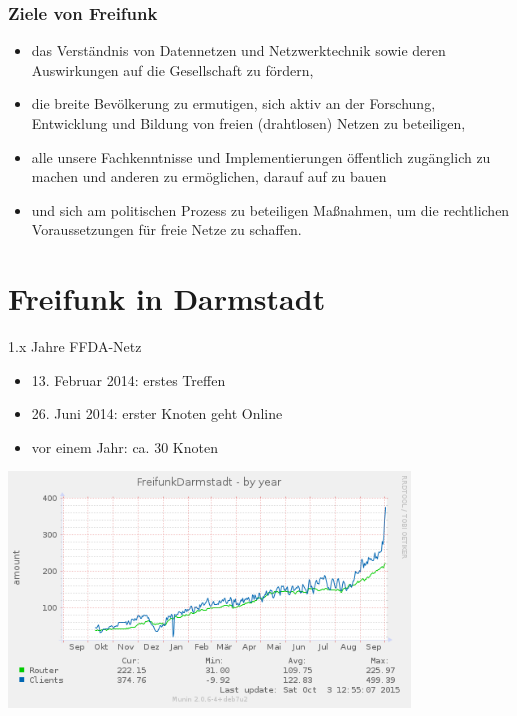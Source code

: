 \documentclass[handout]{beamer}
\begin{document}
\begin{frame}
	\frametitle{Ziele von Freifunk}
	\begin{itemize}[<+->]
		\item das Verständnis von Datennetzen und Netzwerktechnik sowie deren Auswirkungen auf die Gesellschaft zu fördern,
		\item die breite Bevölkerung zu ermutigen, sich aktiv an der Forschung, Entwicklung und Bildung von freien (drahtlosen) Netzen zu beteiligen,
		\item 	alle unsere Fachkenntnisse und Implementierungen öffentlich zugänglich zu machen und anderen zu ermöglichen, darauf auf zu bauen
		\item und sich am politischen Prozess zu beteiligen Maßnahmen, um die rechtlichen Voraussetzungen für freie Netze zu schaffen.
	\end{itemize}
\end{frame}


\section{Freifunk in Darmstadt}




\begin{frame}{1.x Jahre FFDA-Netz}
	\vfill
	\begin{itemize}[<+->]
		\item 13. Februar 2014: erstes Treffen
		\item 26. Juni 2014: erster Knoten geht Online
		\item vor einem Jahr: ca. 30 Knoten
	\end{itemize}
	\pause
	\begin{center}
		\includegraphics[width=0.8\textwidth]{images/ffda-Okt14-15}
	\end{center}
\end{frame}
\end{document}
